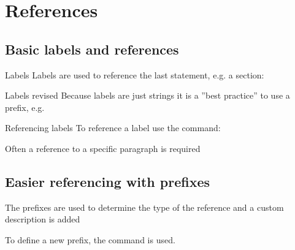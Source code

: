 \section{References}

\subsection{Basic labels and references}
\begin{frame}
	\begin{block}{Labels}
		Labels are used to reference the last statement, e.g. a section:
	\end{block}

	\begin{block}{Labels revised}
		Because labels are just strings it is a ''best practice'' to use a prefix, e.g.
	\end{block}
\end{frame}

\begin{frame}
	\begin{block}{Referencing labels}
		To reference a label use the  command:
	\end{block}
\end{frame}

\begin{frame}
	Often a reference to a specific paragraph is required


\end{frame}

\subsection{Easier referencing with prefixes}
\begin{frame}
	The prefixes are used to determine the type of the reference and a custom
	description is added

	To define a new prefix, the command 
	is used.
\end{frame}

